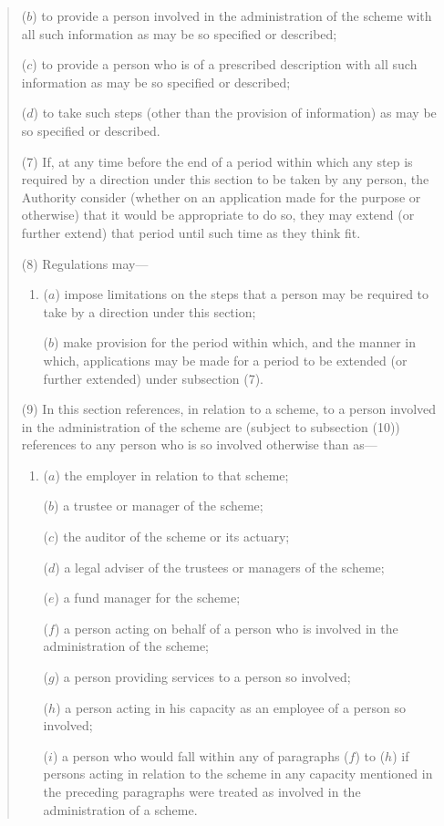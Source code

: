 \documentclass[12pt,a4paper]{article}
\begin{document}
\begin{quotation}
\begin{enumerate}
($b$) to provide a person involved in the administration of the scheme with all such information as may be so specified or described;

($c$) to provide a person who is of a prescribed description with all such information as may be so specified or described;

($d$) to take such steps (other than the provision of information) as may be so specified or described.
\end{enumerate}

(7) If, at any time before the end of a period within which any step is required by a direction under this section to be taken by any person, the Authority consider (whether on an application made for the purpose or otherwise) that it would be appropriate to do so, they may extend (or further extend) that period until such time as they think fit.

(8) Regulations may—
\begin{enumerate}\item[]
($a$) impose limitations on the steps that a person may be required to take by a direction under this section;

($b$) make provision for the period within which, and the manner in which, applications may be made for a period to be extended (or further extended) under subsection (7).
\end{enumerate}

(9) In this section references, in relation to a scheme, to a person involved in the administration of the scheme are (subject to subsection (10)) references to any person who is so involved otherwise than as—
\begin{enumerate}\item[]
($a$) the employer in relation to that scheme;

($b$) a trustee or manager of the scheme;

($c$) the auditor of the scheme or its actuary;

($d$) a legal adviser of the trustees or managers of the scheme;

($e$) a fund manager for the scheme;

($f$) a person acting on behalf of a person who is involved in the administration of the scheme;

($g$) a person providing services to a person so involved;

($h$) a person acting in his capacity as an employee of a person so involved;

($i$) a person who would fall within any of paragraphs ($f$)  to ($h$)  if persons acting in relation to the scheme in any capacity mentioned in the preceding paragraphs were treated as involved in the administration of a scheme.
\end{enumerate}


\end{quotation}
\end{document}
